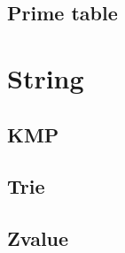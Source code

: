\subsection{Prime table}


\section{String}

\subsection{KMP}

\subsection{Trie}

\subsection{Zvalue}
